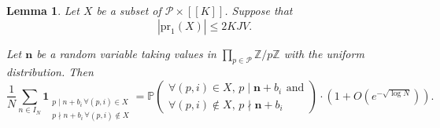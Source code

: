 \documentclass[11pt]{amsart}
\newtheorem{lemma}[theorem]{Lemma}
\theoremstyle{definition}
\renewcommand{\leq}{\leqslant}
\newcommand{\sinterval}[1]{[\![#1]\!] }
\newcommand{\ind}[1]{\mathbf{1}_{#1}}
\newcommand{\Z}{\mathbb{Z}}
\newcommand{\N}{I_N}
\newcommand{\primes}{\mathcal{P}}
\newcommand{\n}{\mathbf{n}}
\newcommand{\curlyL}{V}
\newcommand{\sommespart}{b}
\newcommand{\repR}{J}
\newcommand{\repK}{K}
\newcommand{\newK}{\sinterval{K}}
\newcommand{\Div}{X}
\begin{document}
\begin{lemma}
\label{lem:kubilius}
Let $\Div$ be a subset of $\primes \times \newK$. Suppose that 
\begin{equation*}
|\mathrm{pr}_1(\Div)| \leq 2\repK\repR \curlyL.
\end{equation*}

Let $\n$ be a random variable taking values in $\prod_{p\in \primes} \Z/p\Z$ with the uniform distribution. Then
\begin{equation*}
 \frac1N\sum_{n\in \N}\ind{\substack{p\mid n+\sommespart_i\, \forall (p, i)\in \Div  \\ p\nmid n+\sommespart_i\, \forall (p, i)\notin \Div}} 
 =  \mathbb{P} \left(
	\begin{aligned}\forall (p, i)\in \Div, \, p\mid \n+\sommespart_i \, \ \mathrm{and}\\ \forall (p, i)\notin \Div, \, p\nmid \n+\sommespart_i \ \ \  \ \ \ 
	\end{aligned}
\right) \cdot \left(1+O\left(e^{-\sqrt{\log N}}\right)\right).
\end{equation*}
\end{lemma}
\end{document}
